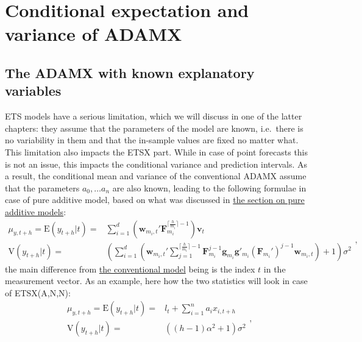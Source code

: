 \documentclass[
]{book}
\theoremstyle{definition}
\theoremstyle{definition}
\theoremstyle{definition}
\theoremstyle{definition}
\theoremstyle{remark}
\begin{document}
\hypertarget{ADAMXConventionalConditionalMoments}{%
\section{Conditional expectation and variance of ADAMX}\label{ADAMXConventionalConditionalMoments}}

\hypertarget{the-adamx-with-known-explanatory-variables}{%
\subsection{The ADAMX with known explanatory variables}\label{the-adamx-with-known-explanatory-variables}}

ETS models have a serious limitation, which we will discuss in one of the latter chapters: they assume that the parameters of the model are known, i.e.~there is no variability in them and that the in-sample values are fixed no matter what. This limitation also impacts the ETSX part. While in case of point forecasts this is not an issue, this impacts the conditional variance and prediction intervals. As a result, the conditional mean and variance of the conventional ADAMX assume that the parameters \(a_0, \dots a_n\) are also known, leading to the following formulae in case of pure additive model, based on what was discussed in \protect\hyperlink{pureAdditiveExpectationAndVariance}{the section on pure additive models}:
\begin{equation}
  \begin{aligned}
    \mu_{y,t+h} = \text{E}(y_{t+h}|t) = & \sum_{i=1}^d \left(\mathbf{w}_{m_i,t}' \mathbf{F}_{m_i}^{\lceil\frac{h}{m_i}\rceil-1} \right) \mathbf{v}_{t} \\
    \text{V}(y_{t+h}|t) = & \left( \sum_{i=1}^d \left(\mathbf{w}_{m_i,t}' \sum_{j=1}^{\lceil\frac{h}{m_i}\rceil-1} \mathbf{F}_{m_i}^{j-1} \mathbf{g}_{m_i} \mathbf{g}'_{m_i} (\mathbf{F}_{m_i}')^{j-1} \mathbf{w}_{m_i,t} \right) + 1 \right) \sigma^2
  \end{aligned},
  \label{eq:ETSXADAMStateSpaceANNRecursionMeanAndVarianceGeneral}
\end{equation}
the main difference from \protect\hyperlink{pureAdditiveExpectationAndVariance}{the conventional model} being is the index \(t\) in the measurement vector. As an example, here how the two statistics will look in case of ETSX(A,N,N):
\begin{equation}
  \begin{aligned}
    \mu_{y,t+h} = \text{E}(y_{t+h}|t) = & l_{t} + \sum_{i=1}^n a_i x_{i,t+h} \\
    \text{V}(y_{t+h}|t) = & \left((h-1) \alpha^2 + 1 \right) \sigma^2
  \end{aligned},
  \label{eq:ETSXADAMStateSpaceANNRecursionMeanAndVariance}
\end{equation}
\end{document}
